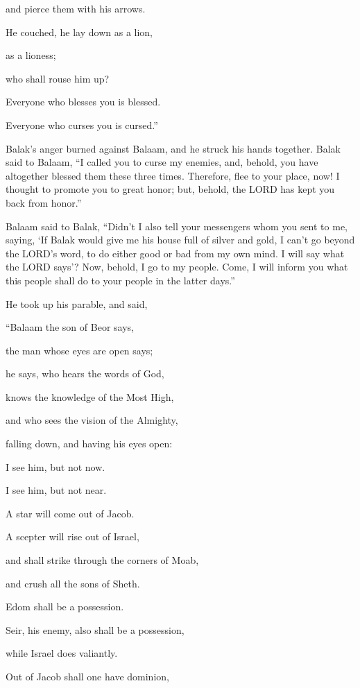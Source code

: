 and pierce them with his arrows.


\myverse{}He couched, he lay down as a lion,

as a lioness;

who shall rouse him up?

Everyone who blesses you is blessed.

Everyone who curses you is cursed.”


\myverse{}Balak’s anger burned against Balaam, and he struck his hands
together. Balak said to Balaam, “I called you to curse my enemies, and, behold, you have altogether blessed
them these three times.
\myverse{}Therefore, flee to your place, now! I thought to promote you to great honor;
but, behold, the LORD has kept you back from honor.”


\myverse{}Balaam said to Balak, “Didn’t I also tell your messengers whom
you sent to me, saying,
\myverse{}‘If Balak would give me his house full of silver and gold, I can’t go beyond
the LORD’s word, to do either good or bad from my own mind. I will say what the LORD says’?
\myverse{}Now, behold, I go to my people. Come, I will inform you what this people
shall do to your people in the latter days.”


\myverse{}He took up his parable, and said,

“Balaam the son of Beor says,

the man whose eyes are open says;


\myverse{}he says, who hears the words of God,

knows the knowledge of the Most High,

and who sees the vision of the Almighty,

falling down, and having his eyes open:


\myverse{}I see him, but not now.

I see him, but not near.

A star will come out of Jacob.

A scepter will rise out of Israel,

and shall strike through the corners of Moab,

and crush all the sons of Sheth.


\myverse{}Edom shall be a possession.

Seir, his enemy, also shall be a possession,

while Israel does valiantly.


\myverse{}Out of Jacob shall one have dominion,

